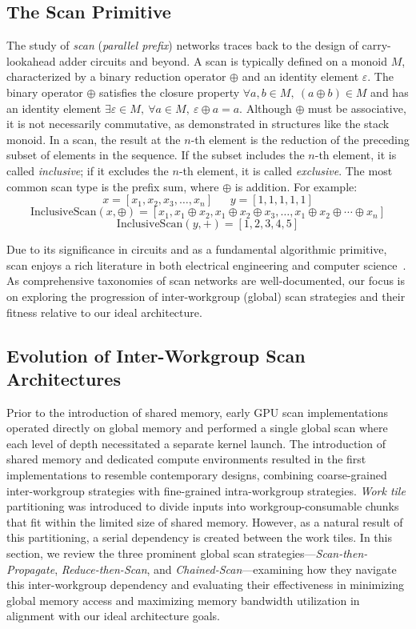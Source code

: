 \documentclass[sigconf]{acmart}
\begin{document}
\subsection{The Scan Primitive}
The study of \emph{scan} (\emph{parallel prefix}) networks traces back to the design of carry-lookahead adder circuits and beyond\cite{10.1145/322217.322232, 5219801}. A scan is typically defined on a monoid \( M \), characterized by a binary reduction operator \( \oplus \) and an identity element \( \varepsilon \). The binary operator \( \oplus \) satisfies the closure property \( \forall a, b \in M, \ (a \oplus b) \in M \) and has an identity element \( \exists \varepsilon \in M, \ \forall a \in M, \ \varepsilon \oplus a = a \). Although \( \oplus \) must be associative, it is not necessarily commutative, as demonstrated in structures like the stack monoid\cite{}. In a scan, the result at the \( n \)-th element is the reduction of the preceding subset of elements in the sequence. If the subset includes the \( n \)-th element, it is called \textit{inclusive}; if it excludes the \( n \)-th element, it is called \textit{exclusive}. The most common scan type is the prefix sum, where \( \oplus \) is addition. For example:
\[
  x = [x_1, x_2, x_3, \dots, x_n] \ \ \ \ \ \ \ y = [1, 1, 1, 1, 1] 
\]
\[
  \text{InclusiveScan}(x, \oplus) = [x_1, x_1 \oplus x_2, x_1 \oplus x_2 \oplus x_3, \dots, x_1 \oplus x_2 \oplus \cdots \oplus x_n]
\]
\[
  \text{InclusiveScan}(y, +) = [1, 2, 3, 4, 5]
\]

Due to its significance in circuits and as a fundamental algorithmic primitive, scan enjoys a rich literature in both electrical engineering and computer science~\cite{}. As comprehensive taxonomies of scan networks are well-documented, our focus is on exploring the progression of inter-workgroup (global) scan strategies and their fitness relative to our ideal architecture.

\subsection{Evolution of Inter-Workgroup Scan Architectures}
Prior to the introduction of shared memory, early GPU scan implementations~\cite{Horn, Hensley, Greß, Sengupta} operated directly on global memory and performed a single global scan where each level of depth necessitated a separate kernel launch. The introduction of shared memory and dedicated compute environments resulted in the first implementations to resemble contemporary designs, combining coarse-grained inter-workgroup strategies with fine-grained intra-workgroup strategies. \emph{Work tile} partitioning was introduced to divide inputs into workgroup-consumable chunks that fit within the limited size of shared memory. However, as a natural result of this partitioning, a serial dependency is created between the work tiles. In this section, we review the three prominent global scan strategies—\emph{Scan-then-Propagate}, \emph{Reduce-then-Scan}, and \emph{Chained-Scan}—examining how they navigate this inter-workgroup dependency and evaluating their effectiveness in minimizing global memory access and maximizing memory bandwidth utilization in alignment with our ideal architecture goals.
\end{document}
